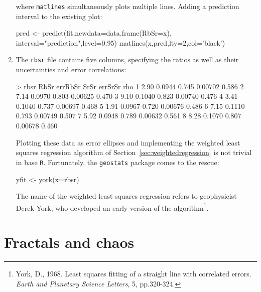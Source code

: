 \begin{enumerate}
\noindent where \texttt{matlines} simultaneously plots multiple lines.
Adding a prediction interval to the existing plot:

\begin{script}[firstnumber=13]
pred <- predict(fit,newdata=data.frame(RbSr=x),
                interval="prediction",level=0.95)
matlines(x,pred,lty=2,col='black')
\end{script}

\item The \texttt{rbsr} file contains five columns, specifying the
  ratios as well as their uncertainties and error correlations:

\begin{console}
> rbsr
  RbSr errRbSr  SrSr errSrSr   rho
1 2.90  0.0944 0.745 0.00702 0.586
2 7.14  0.0970 0.803 0.00625 0.470
3 9.10  0.1040 0.823 0.00740 0.476
4 3.41  0.1040 0.737 0.00697 0.468
5 1.91  0.0967 0.720 0.00676 0.486
6 7.15  0.1110 0.793 0.00749 0.507
7 5.92  0.0948 0.789 0.00632 0.561
8 8.28  0.1070 0.807 0.00678 0.460
\end{console}

Plotting these data as error ellipses and implementing the
weighted least squares regression algorithm of
Section~\ref{sec:weightedregression} is not trivial in base
\texttt{R}. Fortunately, the \texttt{geostats} package comes to the
rescue:

\begin{script}[firstnumber=16]
yfit <- york(x=rbsr)
\end{script}

The name of the weighted least squares regression refers to
geophysicist Derek York, who developed an early version of the
algorithm\footnote{York, D., 1968. Least squares fitting of a straight
  line with correlated errors. \emph{Earth and Planetary Science
    Letters}, 5, pp.320-324.}.

\end{enumerate}

\section{Fractals and chaos}
\label{sec:R-fractals}

